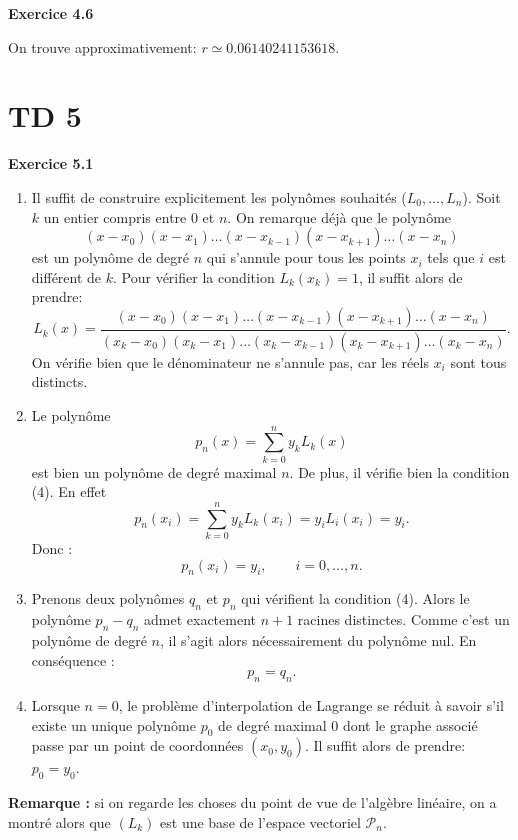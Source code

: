 \documentclass{article}
\begin{document}
{\bf Exercice 4.6}

On trouve approximativement: $r\simeq 0.06140241153618$.

\newpage

\section{TD 5}

{\bf Exercice 5.1}

\begin{enumerate}
    \item Il suffit de construire explicitement les polynômes souhaités ($L_0,\ldots,L_n$). Soit $k$ un entier compris entre $0$ et $n$. On remarque déjà que le polynôme
    \[
    (x - x_0) ( x - x_1) \ldots (x - x_{k-1}) (x - x_{k+1}) \ldots (x - x_n)
    \]
    est un polynôme de degré $n$ qui s'annule pour tous les points $x_i$ tels que $i$ est différent de $k$. Pour vérifier la condition $L_k(x_k)=1$, il suffit alors de prendre:
    \[
    L_k(x) = \frac{(x - x_0) ( x - x_1) \ldots (x - x_{k-1}) (x - x_{k+1}) \ldots (x - x_n)}{(x_k - x_0) ( x_k - x_1) \ldots (x_k - x_{k-1}) (x_k - x_{k+1}) \ldots (x_k - x_n)}.
    \]
    On vérifie bien que le dénominateur ne s'annule pas, car les réels $x_i$ sont tous distincts.
    
    \item Le polynôme 
    \[
    p_n(x) = \sum_{k=0}^n y_k L_k(x)
    \]
    est bien un polynôme de degré maximal $n$. De plus, il 
    vérifie bien la condition (4). En effet
    \[
    p_n(x_i) = \sum_{k=0}^n y_k L_k(x_i) = y_i L_i(x_i) = y_i.
    \]
    Donc : 
    \[
    p_n(x_i)=y_i, \qquad i=0,\ldots,n.
    \]
    
    \item Prenons deux polyn\^omes $q_n$ et $p_n$ qui vérifient la condition (4). Alors le polynôme $p_n-q_n$ admet exactement $n+1$ racines distinctes. Comme c'est un polynôme de degré $n$, il s'agit alors nécessairement du polynôme nul. En conséquence :
    \[
    p_n = q_n.
    \]
    
    \item Lorsque $n=0$, le problème d'interpolation de Lagrange se réduit à savoir s'il existe un unique polynôme $p_0$ de degré maximal $0$ dont le graphe associé passe par un point de coordonnées $(x_0,y_0)$. Il suffit alors de prendre: $p_0 = y_0$.
\end{enumerate}

{\bf Remarque :} si on regarde les choses du point de vue de l'algèbre linéaire, on a montré alors que $(L_k)$ est une base de l'espace vectoriel $\mathcal{P}_n$.
\end{document}
